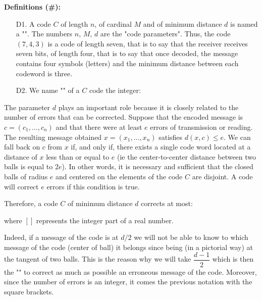 	\pagebreak
	\textbf{Definitions (\#\mydef):}
	\begin{itemize}
		\item[D1.] A code $C$ of length $n$, of cardinal $M$ and of minimum distance $d$ is named a "". The numbers $n$, $M$, $d$ are the "code parameters". Thus, the code $(7, 4, 3)$ is a code of length seven, that is to say that the receiver receives seven bits, of length four, that is to say that once decoded, the message contains four symbols (letters) and the minimum distance between each codeword is three.

		\item[D2.] We name "" of a $C$ code the integer:
		
	\end{itemize}
	The parameter $d$ plays an important role because it is closely related to the number of errors that can be corrected. Suppose that the encoded message is $c=(c_1,\ldots,c_n)$ and that there were at least $e$ errors of transmission or reading. The resulting message obtained $x=(x_1,\ldots,x_n)$ satisfies $d(x,c)\le e$. We can fall back on $c$ from $x$ if, and only if, there exists a single code word located at a distance of $x$ less than or equal to $e$ (ie the center-to-center distance between two balls is equal to $2e$). In other words, it is necessary and sufficient that the closed balls of radius $e$ and centered on the elements of the code $C$ are disjoint. A code will correct $e$ errors if this condition is true.

	Therefore, a code $C$ of minimum distance $d$ corrects at most:
	
	where $[]$ represents the integer part of a real number.

	Indeed, if a message of the code is at $d/2$ we will not be able to know to which message of the code (center of ball) it belongs since being (in a pictorial way) at the tangent of two balls. This is the reason why we will take $\dfrac{d-1}{2}$ which is then the "" to correct as much as possible an erroneous message of the code. Moreover, since the number of errors is an integer, it comes the previous notation with the square brackets.
	
